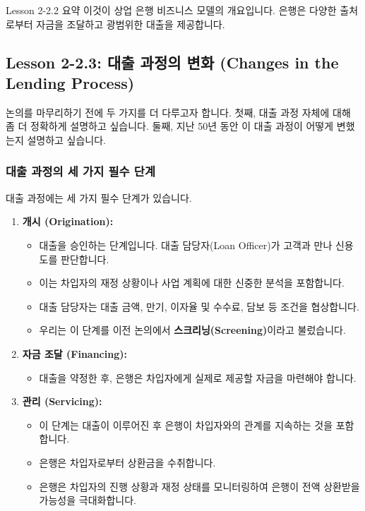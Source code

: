 \documentclass[11pt,a4paper]{article}
\begin{document}
\begin{summarybox}{Lesson 2-2.2 요약}
이것이 상업 은행 비즈니스 모델의 개요입니다. 은행은 다양한 출처로부터 자금을 조달하고 광범위한 대출을 제공합니다.
\end{summarybox}

\newpage
\subsection{Lesson 2-2.3: 대출 과정의 변화 (Changes in the Lending Process)}

논의를 마무리하기 전에 두 가지를 더 다루고자 합니다. 첫째, 대출 과정 자체에 대해 좀 더 정확하게 설명하고 싶습니다. 둘째, 지난 50년 동안 이 대출 과정이 어떻게 변했는지 설명하고 싶습니다.

\subsubsection*{대출 과정의 세 가지 필수 단계}
대출 과정에는 세 가지 필수 단계가 있습니다.
\begin{enumerate}
    \item \textbf{개시 (Origination):}
    \begin{itemize}
        \item 대출을 승인하는 단계입니다. 대출 담당자(Loan Officer)가 고객과 만나 신용도를 판단합니다.
        \item 이는 차입자의 재정 상황이나 사업 계획에 대한 신중한 분석을 포함합니다.
        \item 대출 담당자는 대출 금액, 만기, 이자율 및 수수료, 담보 등 조건을 협상합니다.
        \item 우리는 이 단계를 이전 논의에서 \textbf{스크리닝(Screening)}이라고 불렀습니다.
    \end{itemize}

    \item \textbf{자금 조달 (Financing):}
    \begin{itemize}
        \item 대출을 약정한 후, 은행은 차입자에게 실제로 제공할 자금을 마련해야 합니다.
    \end{itemize}

    \item \textbf{관리 (Servicing):}
    \begin{itemize}
        \item 이 단계는 대출이 이루어진 후 은행이 차입자와의 관계를 지속하는 것을 포함합니다.
        \item 은행은 차입자로부터 상환금을 수취합니다.
        \item 은행은 차입자의 진행 상황과 재정 상태를 모니터링하여 은행이 전액 상환받을 가능성을 극대화합니다.
    \end{itemize}
\end{enumerate}
\end{document}
